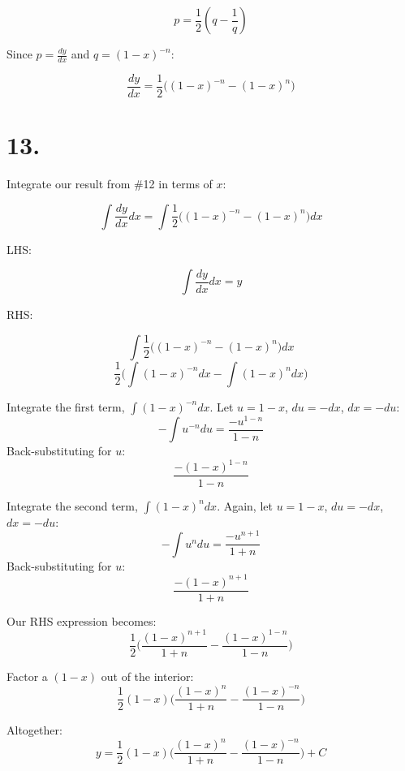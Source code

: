 \documentclass[11pt]{report}
\begin{document}
$$p = \frac{1}{2}(q - \frac{1}{q})$$

Since $p = \frac{dy}{dx}$ and $q = (1-x)^{-n}$:

$$\frac{dy}{dx} = \frac{1}{2}\Big((1-x)^{-n} - (1-x)^n\Big)$$

\section*{13.}

Integrate our result from \#12 in terms of $x$:

$$\int \frac{dy}{dx} dx = \int \frac{1}{2}\Big((1-x)^{-n} - (1-x)^n\Big) dx$$

LHS:

$$\int \frac{dy}{dx} dx = y$$

RHS:

$$\int \frac{1}{2}\Big((1-x)^{-n} - (1-x)^n\Big) dx$$
$$\frac{1}{2}\Big(\int(1-x)^{-n} dx - \int (1-x)^n dx\Big)$$

Integrate the first term, $\int(1-x)^{-n} dx$. Let $u = 1-x$, $du = -dx$, $dx = -du$:
$$-\int u^{-n} du = \frac{-u^{1-n}}{1-n}$$
Back-substituting for $u$:
$$ \frac{-(1-x)^{1-n}}{1-n} $$

Integrate the second term, $\int(1-x)^{n} dx$.
Again, let $u = 1-x$, $du = -dx$, $dx = -du$:
$$-\int u^{n} du = \frac{-u^{n+1}}{1+n}$$
Back-substituting for $u$:
$$ \frac{-(1-x)^{n+1}}{1+n} $$

Our RHS expression becomes:
$$\frac{1}{2}\Big(\frac{(1-x)^{n+1}}{1+n} - \frac{(1-x)^{1-n}}{1-n}\Big)$$

Factor a $(1-x)$ out of the interior:
$$\frac{1}{2}(1-x)\Big(\frac{(1-x)^{n}}{1+n} - \frac{(1-x)^{-n}}{1-n}\Big)$$

Altogether:
$$y = \frac{1}{2}(1-x)\Bigg(\frac{(1-x)^{n}}{1+n} - \frac{(1-x)^{-n}}{1-n}\Bigg) + C$$
\end{document}
